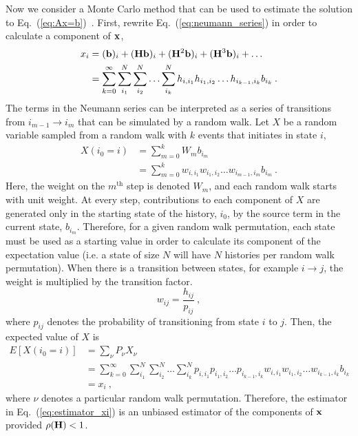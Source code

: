 Now we consider a Monte Carlo method that can be used to estimate the solution
to Eq.~(\ref{eq:Ax=b})~\cite{hammersley_1964}.  First, rewrite
Eq.~(\ref{eq:neumann_series}) in order to calculate a component of $\mathbf{x}$,
\begin{equation}
  \begin{split}
    x_i &= (\mathbf{b})_i + (\mathbf{H}\mathbf{b})_i + (\mathbf{H}^2\mathbf{b})_i + (\mathbf{H}^3\mathbf{b})_i +
    \ldots\\
    &= \sum_{k=0}^{\infty}\sum_{i_1}^{N}\sum_{i_2}^{N}\ldots
    \sum_{i_k}^{N}h_{i,i_1}h_{i_1,i_2}\ldots h_{i_{k-1},i_k}b_{i_k}\:.
  \end{split}
  \label{eq:neumann_series_i}
\end{equation}
The terms in the Neumann series can be interpreted as a series of transitions
from $i_{m-1}\rightarrow i_m$ that can be simulated by a random walk.  Let $X$
be a random variable sampled from a random walk with $k$ events that initiates
in state $i$,
\begin{equation}
  \begin{split}
    X(i_0 = i) &= \sum_{m=0}^{k}W_m b_{i_m}\\
    &= \sum_{m=0}^{k}w_{i,i_1}w_{i_1,i_2}\ldots
    w_{i_{m-1},i_m}b_{i_m}\:.
  \end{split}
  \label{eq:estimator_xi}
\end{equation}
Here, the weight on the $m^\text{th}$ step is denoted $W_m$, and each random
walk starts with unit weight. At every step, contributions to each component
of $X$ are generated only in the starting state of the history, $i_0$, by the
source term in the current state, $b_{i_m}$. Therefore, for a given random
walk permutation, each state must be used as a starting value in order to
calculate its component of the expectation value (i.e. a state of size $N$
will have $N$ histories per random walk permutation). When there is a
transition between states, for example $i\rightarrow j$, the weight is
multiplied by the transition factor.
\begin{equation}
  w_{ij} = \frac{h_{ij}}{p_{ij}}\:,
  \label{eq:weight}
\end{equation}
where $p_{ij}$ denotes the probability of transitioning from state $i$ to
$j$. Then, the expected value of $X$ is
\begin{equation}
  \begin{split}
    E[X(i_0=i)] &= \sum_{\nu}P_\nu X_\nu\\
    &= \sum_{k=0}^{\infty}\sum_{i_1}^{N}\sum_{i_2}^{N}\ldots
    \sum_{i_k}^{N}p_{i,i_1}p_{i_1,i_2}\ldots p_{i_{k-1},i_k}
    w_{i,i_1}w_{i_1,i_2}\dots w_{i_{k-1},i_k}b_{i_k}\\
    &= x_i\:,
  \end{split}
  \label{eq:expectation_xi}
\end{equation}
where $\nu$ denotes a particular random walk permutation.  Therefore, the
estimator in Eq.~(\ref{eq:estimator_xi}) is an unbiased estimator of the
components of $\mathbf{x}$ provided $\rho(\mathbf{H}) < 1$.

